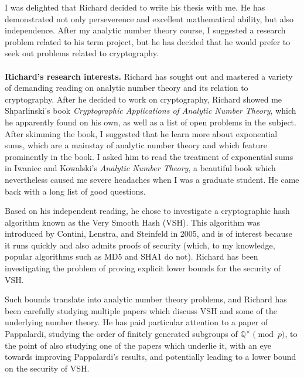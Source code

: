 \documentclass[11pt]{article}
\begin{document}
I was delighted that Richard decided to write his thesis with me. He has
demonstrated not only perseverence and excellent mathematical ability, but also independence. 
After my analytic number theory course, I suggested a research problem related to his term project,
but he has decided that he would prefer to seek out problems related to cryptography.
\\
\\
{\bf Richard's research interests.}
Richard has sought out and mastered a variety of demanding reading on analytic number theory and
its relation to cryptography. After he decided to work on cryptography,
Richard showed me Shparlinski's book {\itshape Cryptographic Applications of Analytic Number Theory},
which he apparently found on his own, as well as a list of open problems in the subject. After
skimming the book, I suggested that he learn more about exponential sums, which are a mainstay of
analytic number theory and which feature prominently in the book. I asked him to read the treatment
of exponential sums in Iwaniec and Kowalski's {\itshape Analytic Number Theory}, a beautiful book which
nevertheless 
caused me severe headaches when I was a graduate student.
He came back with a long list of good questions.

Based on his independent reading, he chose to investigate a cryptographic hash algorithm known as the Very
Smooth Hash (VSH). This algorithm was introduced by Contini, Lenstra, and Steinfeld in 2005, and is of interest
because it runs quickly and also admits proofs of security (which, to my knowledge, popular algorithms such as MD5 and SHA1 do not). Richard has been investigating the problem of proving
explicit lower bounds for 
the security of VSH.

Such bounds translate into analytic number theory problems, and Richard has been carefully studying multiple papers
which discuss VSH and some of the underlying number theory. He has paid particular attention to a paper of
Pappalardi, studying the order of finitely generated subgroups of $\mathbb{Q}^{\times} \pmod{p}$, to the point
of also studying one of the papers which underlie it, with an eye towards improving Pappalardi's results, and 
potentially leading to a lower bound on the security of VSH.
\end{document}
